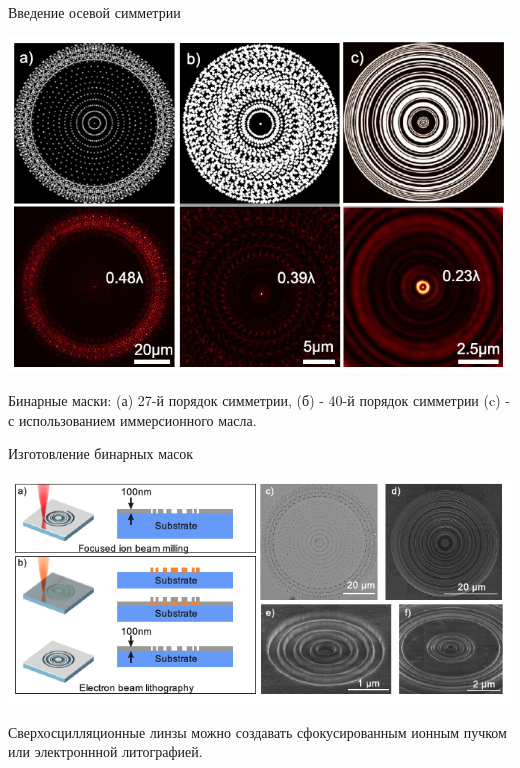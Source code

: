 \documentclass[9pt, compress, xcolor=table]{beamer}
\begin{document}
\begin{frame}{Введение осевой симметрии}
\begin{center}
\includegraphics[width=\textwidth]{nh13}
\end{center}
Бинарные маски: (а) 27-й порядок симметрии, (б) - 40-й порядок симметрии (c) - с использованием иммерсионного масла.
\end{frame}

\begin{frame}{Изготовление бинарных масок}
\begin{center}
\includegraphics[width=\textwidth]{nh14}
\end{center}

Сверхосцилляционные линзы можно создавать сфокусированным ионным пучком или электроннной литографией.

\end{frame}
\end{document}
